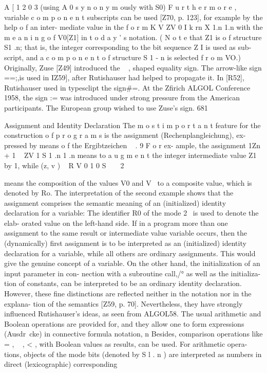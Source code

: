 A [ 1 2 0 3
(using A 0 s y n o n y m ously with S0)
F u r t h e r m o r e , variable c o m p o n e n t subscripts can be
used [Z70, p. 123], for example by the help o f an inter-
mediate value in the f o r m
K V ZV 0 I
k
rn X 1.n 1.n
with the m e a n i n g o f V0[Z1] in t o d a y ' s notation.
( N o t e that Z1 is o f structure S1 .n; that is, the integer
corresponding to the bit sequence Z I is used as sub-
script, and a c o m p o n e n t o f structure S 1 - n is selected
f r o m VO.)
Originally, Zuse [Z49] introduced the ~ , shaped equality
sign. The arrow-like sign ==;,is used in IZ59], after Rutishauser
had helped to propagate it. In [R52], Rutishauser used in typesclipt
the sign#=. At the Zfirich ALGOL Conference 1958, the sign
:= was introduced under strong pressure from the American
participants. The European group wished to use Zuse's sign.
681

Assignment and Identity Declaration
The m o s t i m p o r t a n t feature for the construction o f
p r o g r a m s is the assignment (Rechenplangleichung), ex-
pressed by means o f the Ergibtzeichen ~ . 9 F o r ex-
ample, the assignment
1Zn + 1 ~ ZV 1
S 1 .n 1 .n
means to a u g m e n t the integer intermediate value Z1 by
1, while
(z, v ) ~ R
V 0 1 0
S ~ ~ 2~

means the composition of the values V0 and V~ to a
composite value, which is denoted by Ro.
The interpretation of the second example shows that
the assignment comprises the semantic meaning of an
(initialized) identity declaration for a variable: The
identifier R0 of the mode 2~ is used to denote the elab-
orated value on the left-hand side.
If in a program more than one assignment to the
same result or intermediate value variable occurs, then
the (dynamically) first assignment is to be interpreted
as an (initialized) identity declaration for a variable,
while all others are ordinary assignments. This would
give the genuine concept of a variable. On the other
hand, the initialization of an input parameter in con-
nection with a subroutine call,/° as well as the initializa-
tion of constants, can be interpreted to be an ordinary
identity declaration. However, these fine distinctions
are reflected neither in the notation nor in the explana-
tion of the semantics [Z59, p. 70]. Nevertheless, they
have strongly influenced Rutishauser's ideas, as seen
from ALGOL58.
The usual arithmetic and Boolean operations are
provided for, and they allow one to form expressions
(Ausdr~cke) in connective formula notation, n Besides,
comparison operations like = , ~ , < , with Boolean
values as results, can be used. For arithmetic opera-
tions, objects of the mode bits (denoted by S l . n ) are
interpreted as numbers in direct (lexicographic) corresponding

